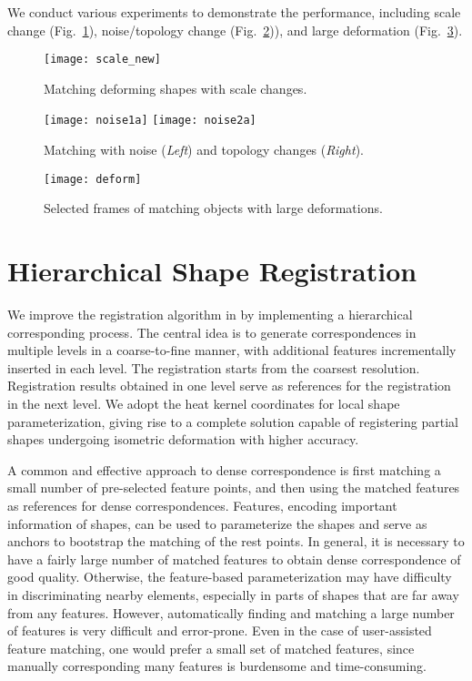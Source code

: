 We conduct various experiments to demonstrate the performance, including scale change
(Fig.~\ref{fig:scale}), noise/topology change (Fig.~\ref{fig:noise})), and
large deformation  (Fig.~\ref{fig:deform}).

\begin{figure}
\centering
\texttt{[image: scale\_new]}
\caption{Matching deforming shapes with scale changes.}
\label{fig:scale}
\end{figure}

\begin{figure}
\centering
\texttt{[image: noise1a]}
\texttt{[image: noise2a]}\\
\caption{Matching with noise (\emph{Left}) and topology changes (\emph{Right}).}
\label{fig:noise}
\end{figure}

\begin{figure}
\centering
\texttt{[image: deform]}
\caption{Selected frames of matching objects with large deformations.}
\label{fig:deform}
\end{figure}


\section{Hierarchical Shape Registration}

We improve the registration algorithm in \cite{Hou:2011:TVCG} by implementing
a hierarchical corresponding process. The central idea is to generate correspondences
in multiple levels in a coarse-to-fine manner, with additional features incrementally
inserted in each level. The registration starts from the coarsest resolution. Registration
results obtained in one level serve as references for the registration in the next level.
We adopt the heat kernel coordinates for local shape parameterization, giving rise to a
complete solution capable of registering partial shapes undergoing isometric deformation
with higher accuracy.

A common and effective approach to dense correspondence is first matching a small number of pre-selected feature points, and then using the matched features as references for dense correspondences. Features, encoding important information of shapes, can be used to parameterize the shapes and serve as anchors to bootstrap the matching of the rest points. In general, it is necessary to have a fairly large number of matched features to obtain dense correspondence of good quality. Otherwise, the feature-based parameterization may have difficulty in discriminating nearby elements, especially in parts of shapes that are far away from any features. However, automatically finding and matching a large number of features is very difficult and error-prone. Even in the case of user-assisted feature matching, one would prefer a small set of matched features, since manually corresponding many features is burdensome and time-consuming.

